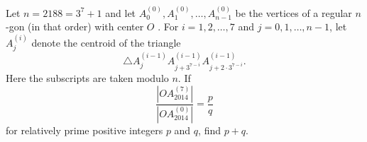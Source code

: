 Let $n = 2188 = 3^7+1$ and let $A_0^{(0)}, A_1^{(0)}, \ldots, A_{n-1}^{(0)}$ be the vertices of a regular $n$-gon (in that order) with center $O$ . For $i = 1, 2, \dots, 7$ and $j=0,1,\dots,n-1$, let $A_j^{(i)}$ denote  the centroid of the triangle \[ \triangle A_j^{(i-1)} A_{j+3^{7-i}}^{(i-1)} A_{j+2 \cdot 3^{7-i}}^{(i-1)}. \] Here the subscripts are taken modulo $n$. If \[ \frac{|OA_{2014}^{(7)}|}{|OA_{2014}^{(0)}|} = \frac{p}{q} \] for relatively prime positive integers $p$ and $q$, find $p+q$.

